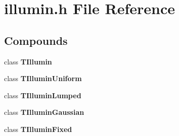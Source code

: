 \section{illumin.h File Reference}
\label{illumin.h}


\subsection*{Compounds}
\begin{CompactItemize}
\item 
class {\bf TIllumin}
\item 
class {\bf TIllumin\-Uniform}
\item 
class {\bf TIllumin\-Lumped}
\item 
class {\bf TIllumin\-Gaussian}
\item 
class {\bf TIllumin\-Fixed}
\end{CompactItemize}
